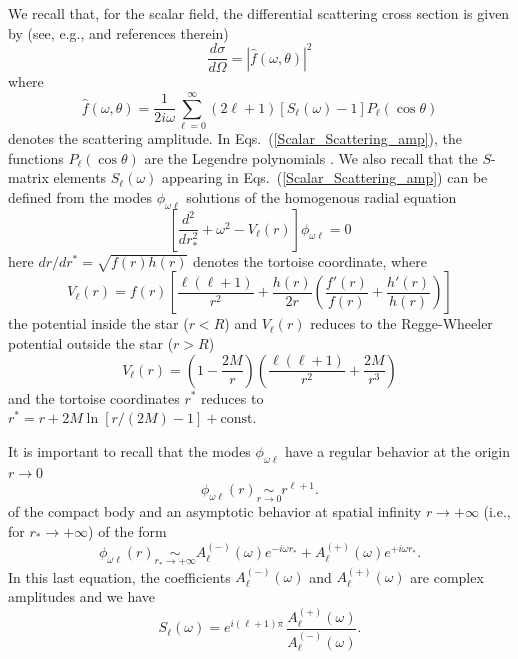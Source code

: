 \documentclass[aps,prd,longbibliography,reprint,twocolumn,amsmath,amssymb,amsfonts,showpacs,superscriptaddress]{revtex4-1}%
\begin{document}
We recall that, for the scalar field, the differential scattering cross section is given by (see, e.g.,\cite{Dolan:2017rtj} and references therein)
\begin{equation}\label{Scalar_Scattering_diff}
  \frac{d\sigma}{d\Omega} = |\hat{f}(\omega,\theta)|^2
\end{equation}
where
\begin{equation}\label{Scalar_Scattering_amp}
 \hat{f}(\omega,\theta) = \frac{1}{2 i \omega} \sum_{\ell = 0}^{\infty} (2\ell+1)[S_{\ell}(\omega)-1]P_{\ell}(\cos\theta)
\end{equation}
denotes the scattering amplitude.  In Eqs.~(\ref{Scalar_Scattering_amp}), the functions $P_{\ell}(\cos\theta)$ are the Legendre polynomials \cite{AS65}.  We also recall that the $S$-matrix elements $S_{\ell}(\omega)$ appearing in Eqs.~(\ref{Scalar_Scattering_amp}) can be defined from the modes $\phi_{\omega \ell}$ solutions of the homogenous radial equation
\begin{equation}
\label{H_Radial_equation}
\left[\frac{d^{2}}{dr_{\ast}^{2}}+\omega^{2}-V_{\ell}(r)\right]\phi_{\omega\ell}= 0
\end{equation}
here $dr/dr^\ast =\sqrt{f(r)h(r)}$ denotes the tortoise coordinate, where
\begin{equation}\label{Inside_Potentiel}
  V_{\ell}(r) =f(r)\left[\frac{\ell(\ell+1)}{r^2}+\frac{h(r)}{2r}\left(\frac{f'(r)}{f(r)}+\frac{h'(r)}{h(r)}\right)\right]
\end{equation}
the potential inside the star ($r<R$) and  $V_{\ell}(r)$ reduces to the Regge-Wheeler potential outside the star ($r>R$)
\begin{equation}\label{RW_Potentiel}
  V_{\ell}(r) =\left(1-\frac{2M}{r}\right)\left(\frac{\ell(\ell+1)}{r^2}+\frac{2M}{r^3}\right)
\end{equation}
and the tortoise coordinates $r^\ast$ reduces to $r^\ast = r+ 2M \ln [r/(2M) -1]+\mathrm{const}$.

It is important to recall that the modes $\phi_{\omega \ell}$ have a regular behavior at the origin $r \to 0$
\begin{equation}\label{bc_1_in}
\phi_{\omega  \ell}(r) \scriptstyle{\underset{r \to 0}{\sim}}
\displaystyle{r^{\ell+1}}.
\end{equation}
of the compact body and an asymptotic behavior at spatial infinity $r \to +\infty$ (i.e., for $r_\ast \to +\infty$) of the form
\begin{equation}\label{bc_2_in}
\phi_{\omega  \ell}(r) \scriptstyle{\underset{r_\ast \to +\infty}{\sim}}
\displaystyle{ A^{(-)}_\ell (\omega) e^{-i\omega r_\ast} + A^{(+)}_\ell (\omega) e^{+i\omega r_\ast}}.
\end{equation}
In this last equation, the coefficients $A^{(-)}_\ell (\omega)$ and  $A^{(+)}_\ell (\omega)$ are complex amplitudes and we have
\begin{equation}\label{Matrix_S}
  S_{\ell}(\omega) =  e^{i(\ell+1)\pi} \, \frac{A_{\ell}^{(+)}(\omega)}{A_{\ell}^{(-)}(\omega)}.
\end{equation}
\end{document}

